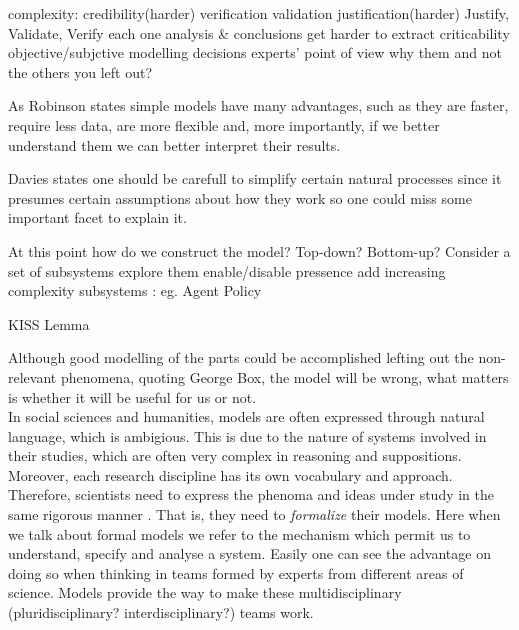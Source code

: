 \documentclass{report}
\begin{document}

complexity:
	credibility(harder)
		verification
		validation
	justification(harder)
		Justify, Validate, Verify each one
	analysis & conclusions get harder to extract	
	criticability
		objective/subjctive modelling decisions
		experts' point of view
		why them and not the others you left out?

As Robinson \cite{Robinson2008} states simple models have many advantages, 
  such as they are faster, 
  require less data, 
  are more flexible 
  and, more importantly, if we better understand them we can better interpret their results.

Davies \cite{Davies2003} states one should be carefull to simplify certain natural processes 
since it presumes certain assumptions about how they work so one could miss some important facet to explain it.

At this point how do we construct the model?
	Top-down?
	Bottom-up?
	Consider a set of subsystems
		explore them enable/disable pressence
		add increasing complexity subsystems : eg. Agent Policy

KISS Lemma


Although good modelling of the parts could be accomplished lefting out the non-relevant phenomena, quoting George Box, the model will be wrong, what matters is whether it will be useful for us or not.\\

In social sciences and humanities, models are often expressed through natural language, which is ambigious. This is due to the nature of systems involved in their studies, which are often very complex in reasoning and suppositions. Moreover, each research discipline has its own vocabulary and approach. Therefore, scientists need to express the phenoma and ideas under study in the same rigorous manner \cite{Leeuw2004}. That is, they need to \textit{formalize} their models. Here when we talk about formal models we refer to the mechanism which permit us to understand, specify and analyse a system. Easily one can see the advantage on doing so when thinking in teams formed by experts from different areas of science. Models provide the way to make these multidisciplinary (pluridisciplinary? interdisciplinary?) teams work.\\
\end{document}
